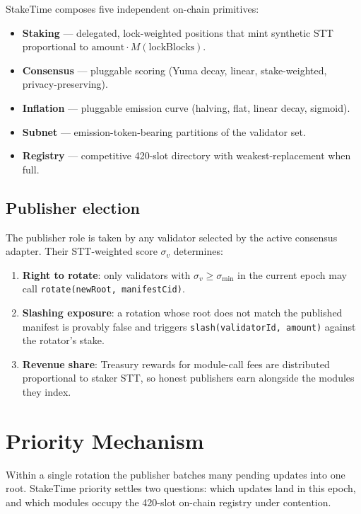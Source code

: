 \documentclass[11pt,a4paper]{article}
\begin{document}
StakeTime composes five independent on-chain primitives:

\begin{itemize}
    \item \textbf{Staking} --- delegated, lock-weighted positions that mint synthetic STT proportional to $\text{amount} \cdot M(\text{lockBlocks})$.
    \item \textbf{Consensus} --- pluggable scoring (Yuma decay, linear, stake-weighted, privacy-preserving).
    \item \textbf{Inflation} --- pluggable emission curve (halving, flat, linear decay, sigmoid).
    \item \textbf{Subnet} --- emission-token-bearing partitions of the validator set.
    \item \textbf{Registry} --- competitive 420-slot directory with weakest-replacement when full.
\end{itemize}

\subsection{Publisher election}

The publisher role is taken by any validator selected by the active consensus adapter. Their STT-weighted score $\sigma_v$ determines:

\begin{enumerate}
    \item \textbf{Right to rotate}: only validators with $\sigma_v \geq \sigma_{\min}$ in the current epoch may call \texttt{rotate(newRoot, manifestCid)}.
    \item \textbf{Slashing exposure}: a rotation whose root does not match the published manifest is provably false and triggers \texttt{slash(validatorId, amount)} against the rotator's stake.
    \item \textbf{Revenue share}: Treasury rewards for module-call fees are distributed proportional to staker STT, so honest publishers earn alongside the modules they index.
\end{enumerate}

\section{Priority Mechanism}
\label{sec:priority}

Within a single rotation the publisher batches many pending updates into one root. StakeTime priority settles two questions: which updates land in this epoch, and which modules occupy the 420-slot on-chain registry under contention.
\end{document}
